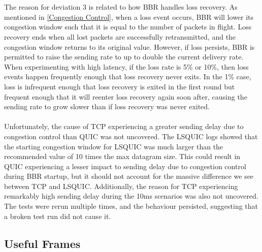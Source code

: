 \documentclass{mpaper}
\begin{document}
\\\\
The reason for deviation 3 is related to how BBR handles loss recovery. As mentioned in \ref{Congestion Control}, when a loss event occurs, BBR will lower its congestion window such that it is equal to the number of packets in flight. Loss recovery ends when all lost packets are successfully retransmitted, and the congestion window returns to its original value. However, if loss persists, BBR is permitted to raise the sending rate to up to double the current delivery rate\cite{BBR}. When experimenting with high latency, if the loss rate is 5\% or 10\%, then loss events happen frequently enough that loss recovery never exits. In the 1\% case, loss is infrequent enough that loss recovery is exited in the first round but frequent enough that it will reenter loss recovery again soon after, causing the sending rate to grow slower than if loss recovery was never exited.
\\\\
Unfortunately, the cause of TCP experiencing a greater sending delay due to congestion control than QUIC was not uncovered. The LSQUIC logs showed that the starting congestion window for LSQUIC was much larger than the recommended value of 10 times the max datagram size. This could result in QUIC experiencing a lesser impact to sending delay due to congestion control during BBR startup, but it should not account for the massive difference we see between TCP and LSQUIC. Additionally, the reason for TCP experiencing remarkably high sending delay during the 10ms scenarios was also not uncovered. The tests were rerun multiple times, and the behaviour persisted, suggesting that a broken test run did not cause it.

\subsection{Useful Frames} \label{Useful Frames}
\end{document}
